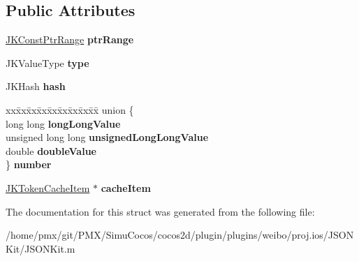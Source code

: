 \subsection*{Public Attributes}
\begin{DoxyCompactItemize}
\item 
\mbox{\label{structJKTokenValue_a3fe09fde3e69bf9f63074714de4f2bfa}} 
\hyperlink{structJKConstPtrRange}{J\+K\+Const\+Ptr\+Range} {\bfseries ptr\+Range}
\item 
\mbox{\label{structJKTokenValue_a905c992619d59026f2a223b4ee660707}} 
J\+K\+Value\+Type {\bfseries type}
\item 
\mbox{\label{structJKTokenValue_aa377f366a9138439789b6da4fd31418d}} 
J\+K\+Hash {\bfseries hash}
\item 
\mbox{\label{structJKTokenValue_ab35281deff85372f71aadbdc692ddee6}} 
\begin{tabbing}
xx\=xx\=xx\=xx\=xx\=xx\=xx\=xx\=xx\=\kill
union \{\\
\>long long {\bfseries longLongValue}\\
\>unsigned long long {\bfseries unsignedLongLongValue}\\
\>double {\bfseries doubleValue}\\
\} {\bfseries number}\\

\end{tabbing}\item 
\mbox{\label{structJKTokenValue_a640704944e9f807c3a9b493bca533480}} 
\hyperlink{structJKTokenCacheItem}{J\+K\+Token\+Cache\+Item} $\ast$ {\bfseries cache\+Item}
\end{DoxyCompactItemize}


The documentation for this struct was generated from the following file\+:\begin{DoxyCompactItemize}
\item 
/home/pmx/git/\+P\+M\+X/\+Simu\+Cocos/cocos2d/plugin/plugins/weibo/proj.\+ios/\+J\+S\+O\+N\+Kit/J\+S\+O\+N\+Kit.\+m\end{DoxyCompactItemize}
